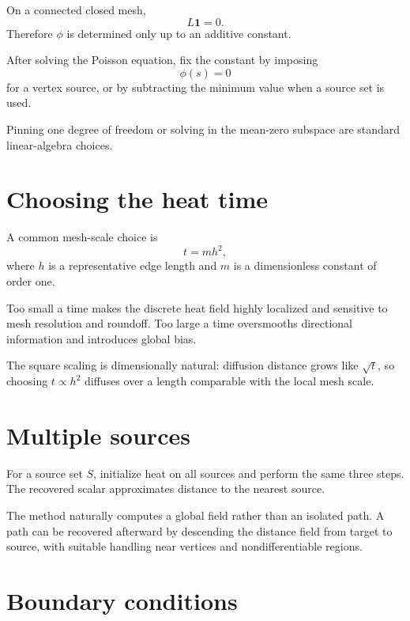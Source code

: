On a connected closed mesh,
\[
L\mathbf 1=0.
\]
Therefore \(\phi\) is determined only up to an additive constant.

\begin{definition}\label{def:vii40-gauge}
After solving the Poisson equation, fix the constant by imposing
\[
\phi(s)=0
\]
for a vertex source, or by subtracting the minimum value when a source set is
used.
\end{definition}

Pinning one degree of freedom or solving in the mean-zero subspace are standard
linear-algebra choices.

\section{Choosing the heat time}

A common mesh-scale choice is
\[
t=m h^2,
\]
where \(h\) is a representative edge length and \(m\) is a dimensionless constant
of order one.

Too small a time makes the discrete heat field highly localized and sensitive to
mesh resolution and roundoff.  Too large a time oversmooths directional
information and introduces global bias.

\begin{remark}\label{rem:vii40-time}
The square scaling is dimensionally natural: diffusion distance grows like
\(\sqrt t\), so choosing \(t\propto h^2\) diffuses over a length comparable with
the local mesh scale.
\end{remark}

\section{Multiple sources}

For a source set \(S\), initialize heat on all sources and perform the same three
steps.  The recovered scalar approximates distance to the nearest source.

The method naturally computes a global field rather than an isolated path.  A
path can be recovered afterward by descending the distance field from target to
source, with suitable handling near vertices and nondifferentiable regions.

\section{Boundary conditions}

